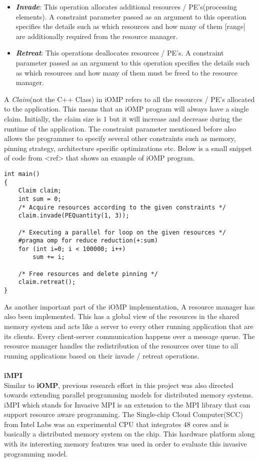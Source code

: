 \begin{itemize}
\item \textbf{\textit{Invade}}: This operation allocates additional resources / PE's(processing elements). A constraint parameter passed as an argument to this operation specifies the details such as which resources and how many of them [range] are additionally required from the resource manager.
\item \textbf{\textit{Retreat}}: This operations deallocates resources / PE's. A constraint parameter passed as an argument to this operation specifies the details such as which resources and how many of them must be freed to the resource manager.
\end{itemize}
A \textit{Claim}(not the C++ Class) in iOMP refers to all the resources / PE's allocated to the application. This means that an iOMP program will always have a single claim. Initially, the claim size is $1$ but it will increase and decrease during the runtime of the application. The constraint parameter mentioned before also allows the programmer to specify several other constraints such as memory, pinning strategy, architecture specific optimizations etc. Below is a small snippet of code from <ref> that shows an example of iOMP program.
\begin{lstlisting}[frame=single]
int main() 
{
	Claim claim;
	int sum = 0;
	/* Acquire resources according to the given constraints */
	claim.invade(PEQuantity(1, 3));
	
	/* Executing a parallel for loop on the given resources */
	#pragma omp for reduce reduction(+:sum)
	for (int i=0; i < 100000; i++)
		sum += i;
	
	/* Free resources and delete pinning */
	claim.retreat();
}		
\end{lstlisting}
As another important part of the iOMP implementation,  A resource manager has also been implemented. This has a global view of the resources in the shared memory system and acts like a server to every other running application that are its clients. Every client-server communication happens over a message queue. The resource manager handles the redistribution of the resources over time to all running applications based on their invade / retreat operations.\\ \\
\textbf{iMPI}\cite{isaias}\\
Similar to \textbf{iOMP}, previous research effort in this project was also directed towards extending parallel programming models for distributed memory systems. iMPI which stands for Invasive MPI is an extension to the MPI library that can support resource aware programming. The Single-chip Cloud Computer(SCC) from Intel Labs was an experimental CPU that integrates 48 cores and is basically a distributed memory system on the chip. This hardware platform along with its interesting memory features was used in order to evaluate this invasive programming model.\\ \\
